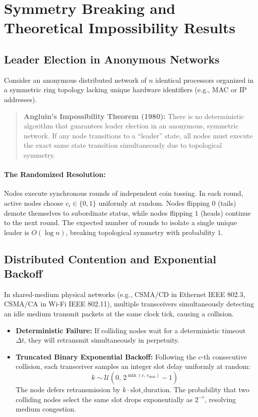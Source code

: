\documentclass[11pt,a4paper]{article}
\begin{document}
\section{Symmetry Breaking and Theoretical Impossibility Results}

\subsection{Leader Election in Anonymous Networks}
Consider an anonymous distributed network of $n$ identical processors organized in a symmetric ring topology lacking unique hardware identifiers (e.g., MAC or IP addresses).

\begin{quote}
\textbf{Angluin's Impossibility Theorem (1980):} There is no deterministic algorithm that guarantees leader election in an anonymous, symmetric network. If any node transitions to a ``leader'' state, all nodes must execute the exact same state transition simultaneously due to topological symmetry.
\end{quote}

\paragraph{The Randomized Resolution:}
Nodes execute synchronous rounds of independent coin tossing. In each round, active nodes choose $c_i \in \{0, 1\}$ uniformly at random. Nodes flipping $0$ (tails) demote themselves to subordinate status, while nodes flipping $1$ (heads) continue to the next round. The expected number of rounds to isolate a single unique leader is $O(\log n)$, breaking topological symmetry with probability $1$.

\subsection{Distributed Contention and Exponential Backoff}
In shared-medium physical networks (e.g., CSMA/CD in Ethernet IEEE 802.3, CSMA/CA in Wi-Fi IEEE 802.11), multiple transceivers simultaneously detecting an idle medium transmit packets at the same clock tick, causing a collision.
\begin{itemize}
    \item \textbf{Deterministic Failure:} If colliding nodes wait for a deterministic timeout $\Delta t$, they will retransmit simultaneously in perpetuity.
    \item \textbf{Truncated Binary Exponential Backoff:} Following the $c$-th consecutive collision, each transceiver samples an integer slot delay uniformly at random:
    \begin{equation}
    k \sim \mathcal{U}\left(0, \, 2^{\min(c, \, c_{\max})} - 1\right)
    \end{equation}
    The node defers retransmission by $k \cdot \text{slot\_duration}$. The probability that two colliding nodes select the same slot drops exponentially as $2^{-c}$, resolving medium congestion.
\end{itemize}
\end{document}

